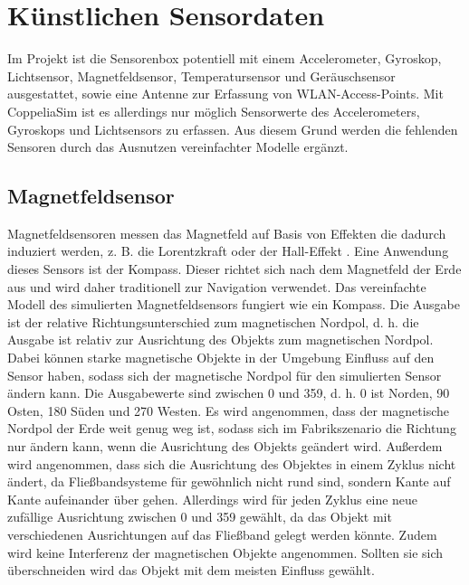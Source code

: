 \section{Künstlichen Sensordaten}
Im Projekt ist die Sensorenbox potentiell mit einem Accelerometer, Gyroskop, Lichtsensor, Magnetfeldsensor,
Temperatursensor und Geräuschsensor ausgestattet, sowie eine Antenne zur Erfassung von WLAN-Access-Points.
Mit CoppeliaSim ist es allerdings nur möglich Sensorwerte des Accelerometers, Gyroskops und Lichtsensors zu erfassen.
Aus diesem Grund werden die fehlenden Sensoren durch das Ausnutzen vereinfachter Modelle ergänzt.

\subsection{Magnetfeldsensor}
Magnetfeldsensoren messen das Magnetfeld auf Basis von Effekten die dadurch induziert werden, z. B. die Lorentzkraft oder der Hall-Effekt \cite{thompsonMEMS}.
Eine Anwendung dieses Sensors ist der Kompass.
Dieser richtet sich nach dem Magnetfeld der Erde aus und wird daher traditionell zur Navigation verwendet.
\newline
\newline
Das vereinfachte Modell des simulierten Magnetfeldsensors fungiert wie ein Kompass.
Die Ausgabe ist der relative Richtungsunterschied zum magnetischen Nordpol,
d. h. die Ausgabe ist relativ zur Ausrichtung des Objekts zum magnetischen Nordpol.
Dabei können starke magnetische Objekte in der Umgebung Einfluss auf den Sensor haben,
sodass sich der magnetische Nordpol für den simulierten Sensor ändern kann.
Die Ausgabewerte sind zwischen 0 und 359, d. h. 0 ist Norden, 90 Osten, 180 Süden und 270 Westen.
\newline
\newline
Es wird angenommen, dass der magnetische Nordpol der Erde weit genug weg ist,
sodass sich im Fabrikszenario die Richtung nur ändern kann, wenn die Ausrichtung des Objekts geändert wird.
Außerdem wird angenommen, dass sich die Ausrichtung des Objektes in einem Zyklus nicht ändert,
da Fließbandsysteme für gewöhnlich nicht rund sind, sondern Kante auf Kante aufeinander über gehen.
Allerdings wird für jeden Zyklus eine neue zufällige Ausrichtung zwischen 0 und 359 gewählt,
da das Objekt mit verschiedenen Ausrichtungen auf das Fließband gelegt werden könnte.
Zudem wird keine Interferenz der magnetischen Objekte angenommen.
Sollten sie sich überschneiden wird das Objekt mit dem meisten Einfluss gewählt.
\newline
